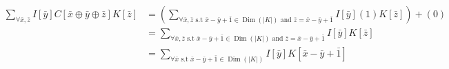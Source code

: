 \documentclass[12pt]{book}
\theoremstyle{plain}
\theoremstyle{definition}
\theoremstyle{ppart}
\theoremstyle{case}
\theoremstyle{solution}
\DeclareMathOperator{\Dim}{Dim}
\newcommand{\shape}[1]{\left|#1\right|}
\begin{document}
\begin{appendices}
\begin{landscape}
\begin{align*}
  \sum_{\forall \bar{x}, \bar{z}}
    I[\bar{y}]
    C[\bar{x} \oplus \bar{y} \oplus \bar{z}]
    K[\bar{z}]
  &=
  \left(
    \sum_{\forall \bar{x},\bar{z} \text{ s.t } \bar{x}-\bar{y}+\bar{1} \in \Dim(\shape{K}) \text{ and } \bar{z} = \bar{x}-\bar{y}+\bar{1}}
      I[\bar{y}]
      (1)
      K[\bar{z}]
  \right) + (0) \\
  &=
  \sum_{\forall \bar{x},\bar{z} \text{ s.t } \bar{x}-\bar{y}+\bar{1} \in \Dim(\shape{K}) \text{ and } \bar{z} = \bar{x}-\bar{y}+\bar{1}}
    I[\bar{y}]
    K[\bar{z}] \\
  &=
  \sum_{\forall \bar{x} \text{ s.t } \bar{x}-\bar{y}+\bar{1} \in \Dim(\shape{K})}
    I[\bar{y}]
    K[\bar{x}-\bar{y}+\bar{1}]
\end{align*}
\end{landscape}

\end{appendices}



\end{document}
